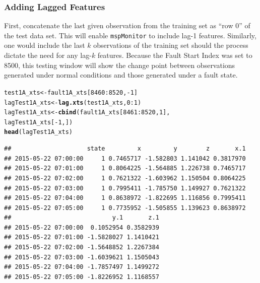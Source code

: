\documentclass{report}\usepackage[]{graphicx}\usepackage[]{color}
\makeatletter
\newcommand{\hlnum}[1]{\textcolor[rgb]{0.686,0.059,0.569}{#1}}%
\newcommand{\hlopt}[1]{\textcolor[rgb]{0,0,0}{#1}}%
\newcommand{\hlstd}[1]{\textcolor[rgb]{0.345,0.345,0.345}{#1}}%
\newcommand{\hlkwb}[1]{\textcolor[rgb]{0.69,0.353,0.396}{#1}}%
\newcommand{\hlkwd}[1]{\textcolor[rgb]{0.737,0.353,0.396}{\textbf{#1}}}%
\newenvironment{kframe}{%
 \def\at@end@of@kframe{}%
 \ifinner\ifhmode%
  \def\at@end@of@kframe{\end{minipage}}%
  \begin{minipage}{\columnwidth}%
 \fi\fi%
 \def\FrameCommand##1{\hskip\@totalleftmargin \hskip-\fboxsep
 \colorbox{shadecolor}{##1}\hskip-\fboxsep
     \hskip-\linewidth \hskip-\@totalleftmargin \hskip\columnwidth}%
 \MakeFramed {\advance\hsize-\width
   \@totalleftmargin\z@ \linewidth\hsize
   \@setminipage}}%
 {\par\unskip\endMakeFramed%
 \at@end@of@kframe}
\newenvironment{knitrout}{}{} %
\makeatother
\begin{document}
\subsubsection{Adding Lagged Features}
First, concatenate the last given observation from the training set as ``row 0'' of the test data set. This will enable \texttt{mspMonitor} to include lag-1 features. Similarly, one would include the last $k$ observations of the training set should the process dictate the need for any lag-$k$ features. Because the Fault Start Index was set to 8500, this testing window will show the change point between observations generated under normal conditions and those generated under a fault state.
\begin{knitrout}
\color{fgcolor}\begin{kframe}
\begin{alltt}
\hlstd{test1A_xts} \hlkwb{<-} \hlstd{fault1A_xts[}\hlnum{8460}\hlopt{:}\hlnum{8520}\hlstd{,} \hlopt{-}\hlnum{1}\hlstd{]}
\hlstd{lagTest1A_xts} \hlkwb{<-} \hlkwd{lag.xts}\hlstd{(test1A_xts,} \hlnum{0}\hlopt{:}\hlnum{1}\hlstd{)}
\hlstd{lagTest1A_xts} \hlkwb{<-} \hlkwd{cbind}\hlstd{(fault1A_xts[}\hlnum{8461}\hlopt{:}\hlnum{8520}\hlstd{,}\hlnum{1}\hlstd{],}
                       \hlstd{lagTest1A_xts[}\hlopt{-}\hlnum{1}\hlstd{,])}
\hlkwd{head}\hlstd{(lagTest1A_xts)}
\end{alltt}
\begin{verbatim}
##                     state         x         y        z       x.1
## 2015-05-22 07:00:00     1 0.7465717 -1.582803 1.141042 0.3817970
## 2015-05-22 07:01:00     1 0.8064225 -1.564885 1.226738 0.7465717
## 2015-05-22 07:02:00     1 0.7621322 -1.603962 1.150504 0.8064225
## 2015-05-22 07:03:00     1 0.7995411 -1.785750 1.149927 0.7621322
## 2015-05-22 07:04:00     1 0.8638972 -1.822695 1.116856 0.7995411
## 2015-05-22 07:05:00     1 0.7735952 -1.505855 1.139623 0.8638972
##                            y.1       z.1
## 2015-05-22 07:00:00  0.1052954 0.3582939
## 2015-05-22 07:01:00 -1.5828027 1.1410421
## 2015-05-22 07:02:00 -1.5648852 1.2267384
## 2015-05-22 07:03:00 -1.6039621 1.1505043
## 2015-05-22 07:04:00 -1.7857497 1.1499272
## 2015-05-22 07:05:00 -1.8226952 1.1168557
\end{verbatim}
\end{kframe}
\end{knitrout}
\end{document}
